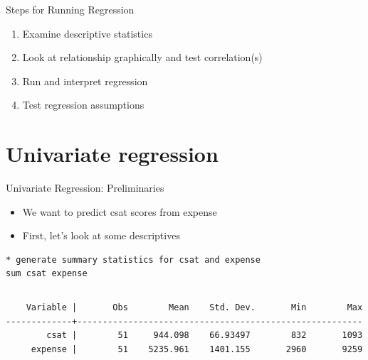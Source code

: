 \documentclass[table,smaller]{beamer}
\begin{document}
\begin{frame}[label=sec-1-5]{Steps for Running Regression}
\begin{enumerate}
\item Examine descriptive statistics
\item Look at relationship graphically and test correlation(s)
\item Run and interpret regression
\item Test regression assumptions
\end{enumerate}
\end{frame}

\section{Univariate regression}
\label{sec-2}

\begin{frame}[fragile,label=sec-2-1]{Univariate Regression: Preliminaries}
 \begin{itemize}
\item We want to predict csat scores from expense
\item First, let's look at some descriptives
\end{itemize}

\begin{verbatim}
* generate summary statistics for csat and expense
sum csat expense
\end{verbatim}

\vspace{-.5em}
\begin{columns}
\begin{block}{}
\begin{verbatim}
    Variable |       Obs        Mean    Std. Dev.       Min        Max
-------------+--------------------------------------------------------
        csat |        51     944.098    66.93497        832       1093
     expense |        51    5235.961    1401.155       2960       9259
\end{verbatim}
\end{block}
\end{columns}
\vspace{.5em}
\end{frame}
\end{document}
